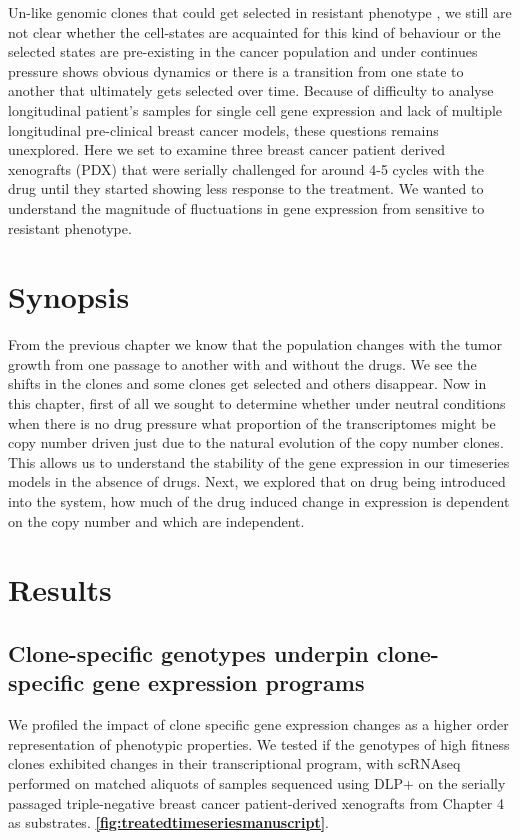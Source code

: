 Un-like genomic clones that could get selected in resistant phenotype \cite{salehi2020single}, we still are not clear whether the cell-states are acquainted for this kind of behaviour or the selected states are pre-existing in the cancer population and under continues pressure shows obvious dynamics or there is a transition from one state to another that ultimately gets selected over time. Because of difficulty to analyse longitudinal patient's samples for single cell gene expression and lack of multiple longitudinal pre-clinical breast cancer models, these questions remains unexplored. Here we set to examine three breast cancer patient derived xenografts (PDX) that were serially challenged for around 4-5 cycles with the drug until they started showing less response to the treatment. We wanted to understand the magnitude of fluctuations in gene expression from sensitive to resistant phenotype.


 \section{Synopsis}
   From the previous chapter we know that the population changes with the tumor growth from one passage to another with and without the drugs. We see the shifts in the clones and some clones get selected and others disappear.
   Now in this chapter, first of all we sought to determine whether under neutral conditions when there is no drug pressure what proportion of the transcriptomes might be copy number driven just due to the natural evolution of the copy number clones. This allows us to understand the stability of the gene expression in our timeseries models in the absence of drugs.
   Next, we explored that on drug being introduced into the system, how much of the drug induced change in expression is dependent on the copy number and which are independent.




\section{Results}


\subsection{Clone-specific genotypes underpin clone-specific gene expression programs}
We profiled the impact of clone specific gene expression changes as a higher order representation of phenotypic properties. We tested if the genotypes of high fitness clones exhibited changes in their transcriptional program, with scRNAseq performed on matched aliquots of samples sequenced using DLP+ on the serially passaged triple-negative breast cancer patient-derived xenografts from Chapter 4 as substrates. \textbf{\autoref{fig:treatedtimeseriesmanuscript}}.

